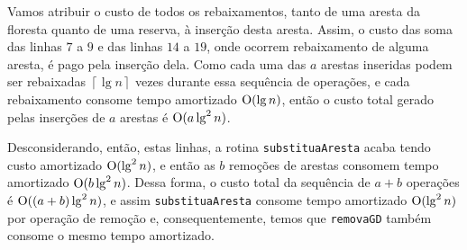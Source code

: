 Vamos atribuir o custo de todos os rebaixamentos, tanto de uma aresta da floresta quanto de uma reserva, à inserção desta aresta. Assim, o custo das soma das linhas $7$ a $9$ e das linhas $14$ a $19$, onde ocorrem rebaixamento  de alguma aresta, é pago pela inserção dela. Como cada uma das $a$ arestas inseridas podem ser rebaixadas $\left\lceil \lg n \right\rceil$ vezes durante essa sequência de operações, e cada rebaixamento consome tempo amortizado $\mathrm{O}(\lg n)$, então o custo total gerado pelas inserções de $a$ arestas é $\mathrm{O}(a \lg^2 n)$. 

Desconsiderando, então, estas linhas, a rotina \texttt{substituaAresta} acaba tendo custo amortizado $\mathrm{O}(\lg^2 n)$, e então as $b$ remoções de arestas consomem tempo amortizado $\mathrm{O}(b \lg^2 n)$. Dessa forma, o custo total da sequência de $a + b$ operações é $\mathrm{O}((a + b)\lg^2 n)$, e assim \texttt{substituaAresta} consome tempo amortizado $\mathrm{O}(\lg^2 n)$ por operação de remoção e, consequentemente, temos que \texttt{removaGD} também consome o mesmo tempo amortizado.